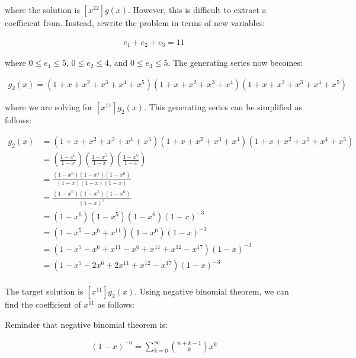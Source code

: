 \documentclass{report}
\begin{document}
{{    where the solution is $[x^22] g(x)$. However, this is difficult to extract
    a coefficient from. Instead, rewrite the problem in terms of new variables:

    \begin{align*}
        e_1 + e_2 + e_3 = 11
    \end{align*}

    where $0 \le e_1 \le 5$, $0 \le e_2 \le 4$, and $0 \le e_3 \le 5$.
    The generating series now becomes:

    \begin{align*}
        g_2(x) = (1 + x + x^2 + x^3 + x^4 + x^5) (1 + x + x^2 + x^3 + x^4) (1 + x + x^2 + x^3 + x^4 + x^5)
    \end{align*}

    where we are solving for $[x^{11}] g_2(x)$. This generating series can be simplified as follows:

    \begin{align*}
        g_2(x) & = (1 + x + x^2 + x^3 + x^4 + x^5) (1 + x + x^2 + x^3 + x^4) (1 + x + x^2 + x^3 + x^4 + x^5) \\
               & = (\frac{1 - x^{6}}{1 - x}) (\frac{1 - x^5}{1 - x}) (\frac{1 - x^6}{1 - x})                 \\
               & = \frac{(1 - x^{6}) (1 - x^5) (1 - x^6)}{(1 - x) (1 - x) (1 - x)}                           \\
               & = \frac{(1 - x^{6}) (1 - x^5) (1 - x^6)}{(1 - x)^3}                                         \\
               & = (1 - x^{6}) (1 - x^5) (1 - x^6) (1-x)^{-3}                                                \\
               & = (1 - x^{5} - x^{6} + x^{11})(1-x^{6}) (1-x)^{-3}                                          \\
               & = (1 - x^{5} - x^{6} + x^{11} - x^{6} + x^{11} + x^{12} - x^{17}) (1-x)^{-3}                \\
               & = (1 - x^{5} - 2x^{6} + 2x^{11} + x^{12} - x^{17}) (1-x)^{-3}                               \\
    \end{align*}

    The target solution is $[x^{11}] g_2(x)$. Using negative binomial theorem,
    we can find the coefficient of $x^{11}$ as follows:

    Reminder that negative binomial theorem is:

    \begin{align*}
        (1 - x)^{-n} = \sum_{k=0}^{\infty} \binom{n+k-1}{k} x^k
    \end{align*}

}}
\end{document}
